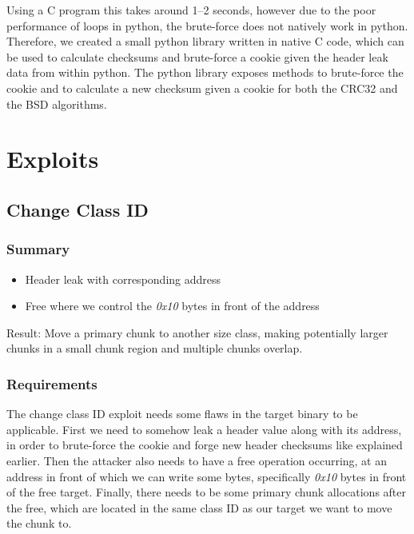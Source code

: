 \documentclass[a4paper,11pt,oneside]{report}
\begin{document}
Using a C program this takes around 1–2 seconds, however due to the poor performance of
loops in python, the brute-force does not natively work in python. Therefore, we created a
small python library written in native C code, which can be used to calculate checksums
and brute-force a cookie given the header leak data from within python. The python library
exposes methods to brute-force the cookie and to calculate a new checksum given a cookie
for both the CRC32 and the BSD algorithms.


\chapter{Exploits}

\section{Change Class ID}

\subsection{Summary}

\begin{itemize}
\item Header leak with corresponding address
\item Free where we control the \emph{0x10} bytes in front of the address
\end{itemize}

Result: Move a primary chunk to another size class, making potentially larger chunks in a
small chunk region and multiple chunks overlap.

\subsection{Requirements}

The change class ID exploit needs some flaws in the target binary to be applicable.  First
we need to somehow leak a header value along with its address, in order to brute-force the
cookie and forge new header checksums like explained earlier. Then the attacker also needs
to have a free operation occurring, at an address in front of which we can write some
bytes, specifically \emph{0x10} bytes in front of the free target. Finally, there needs to
be some primary chunk allocations after the free, which are located in the same class ID
as our target we want to move the chunk to.
\end{document}
